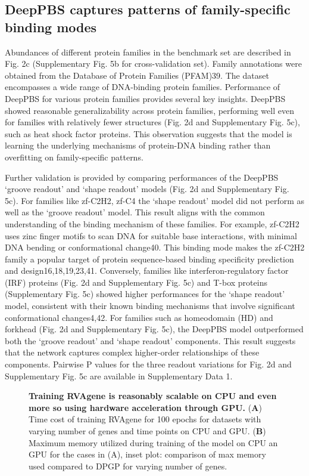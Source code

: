 \subsection{DeepPBS captures patterns of family-specific binding modes}
Abundances of different protein families in the benchmark set are described in Fig. 2c (Supplementary Fig. 5b for cross-validation set). Family annotations were obtained from the Database of Protein Families (PFAM)39. The dataset encompasses a wide range of DNA-binding protein families. Performance of DeepPBS for various protein families provides several key insights. DeepPBS showed reasonable generalizability across protein families, performing well even for families with relatively fewer structures (Fig. 2d and Supplementary Fig. 5c), such as heat shock factor proteins. This observation suggests that the model is learning the underlying mechanisms of protein-DNA binding rather than overfitting on family-specific patterns.
\par
Further validation is provided by comparing performances of the DeepPBS ‘groove readout’ and ‘shape readout’ models (Fig. 2d and Supplementary Fig. 5c). For families like zf-C2H2, zf-C4 the ‘shape readout’ model did not perform as well as the ‘groove readout’ model. This result aligns with the common understanding of the binding mechanism of these families. For example, zf-C2H2 uses zinc finger motifs to scan DNA for suitable base interactions, with minimal DNA bending or conformational change40. This binding mode makes the zf-C2H2 family a popular target of protein sequence-based binding specificity prediction and design16,18,19,23,41. Conversely, families like interferon-regulatory factor (IRF) proteins (Fig. 2d and Supplementary Fig. 5c) and T-box proteins (Supplementary Fig. 5c) showed higher performances for the ‘shape readout’ model, consistent with their known binding mechanisms that involve significant conformational changes4,42. For families such as homeodomain (HD) and forkhead (Fig. 2d and Supplementary Fig. 5c), the DeepPBS model outperformed both the ‘groove readout’ and ‘shape readout’ components. This result suggests that the network captures complex higher-order relationships of these components. Pairwise P values for the three readout variations for Fig. 2d and Supplementary Fig. 5c are available in Supplementary Data 1.

\begin{center}
    \begin{figure}
        \caption[Computational cost of training RVAgene]{\textbf{Training RVAgene is reasonably scalable on CPU and even more so using hardware acceleration through GPU.} ({\bf A}) Time cost of training RVAgene for 100 epochs for datasets with varying number of genes and time points on CPU and GPU. ({\bf B}) Maximum memory utilized during training of the model on CPU an GPU for the cases in (A), inset plot: comparison of max memory used compared to DPGP for varying number of genes.}
  \label{fig:pdna2}
\end{figure}
\end{center}

